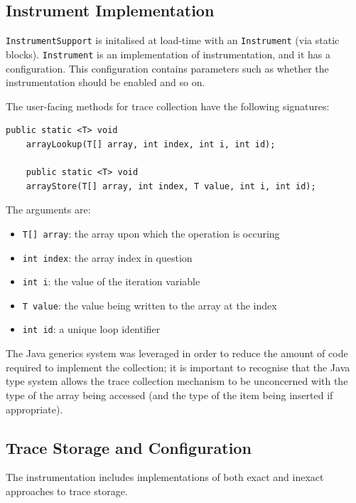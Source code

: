 	\subsection{Instrument Implementation} \label{sec:runtime/implementation/instrument}
	\texttt{InstrumentSupport} is initalised at load-time with an \texttt{Instrument} (via static blocks). \texttt{Instrument} is an implementation of instrumentation, and it has a configuration. This configuration contains parameters such as whether the instrumentation should be enabled and so on.
	
	The user-facing methods for trace collection have the following signatures:
	
	\begin{lstlisting}[caption=Method signatures for instrumentation methods,label=lst:sigs]
	public static <T> void
	arrayLookup(T[] array, int index, int i, int id);
	
	public static <T> void
	arrayStore(T[] array, int index, T value, int i, int id);\end{lstlisting}
	
	The arguments are:
	
	\begin{itemize} \label{items:trace-args}
		\item \texttt{T[] array}: the array upon which the operation is occuring
		\item \texttt{int index}: the array index in question
		\item \texttt{int i}: the value of the iteration variable
		\item \texttt{T value}: the value being written to the array at the index
		\item \texttt{int id}: a unique loop identifier
	\end{itemize}
	
	The Java generics system was leveraged in order to reduce the amount of code required to implement the collection; it is important to recognise that the Java type system allows the trace collection mechanism to be unconcerned with the type of the array being accessed (and the type of the item being inserted if appropriate).
	
	\subsection{Trace Storage and Configuration} \label{sec:runtime/implementation/trace}
	The instrumentation includes implementations of both exact and inexact approaches to trace storage.
	
